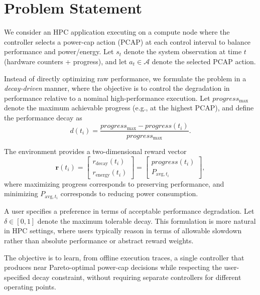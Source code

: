\section{Problem Statement}\label{sec:Problem}

We consider an HPC application executing on a compute node where the controller selects a power-cap action (PCAP) at each control interval to balance performance and power/energy. Let $s_t$ denote the system observation at time $t$ (hardware counters + progress), and let $a_t \in \mathcal{A}$ denote the selected PCAP action.

Instead of directly optimizing raw performance, we formulate the problem in a \textit{decay-driven} manner, where the objective is to control the degradation in performance relative to a nominal high-performance execution. Let $progress_{\max}$ denote the maximum achievable progress (e.g., at the highest PCAP), and define the performance decay as
\begin{equation}
\label{eq:decay}
d(t_i) = \frac{progress_{\max} - progress(t_i)}{progress_{\max}}.
\end{equation}

The environment provides a two-dimensional reward vector
\begin{equation}
\label{eq:reward_vector}
\mathbf{r}(t_i) =
\left[
\begin{array}{c}
r_{\text{decay}}(t_i) \\
r_{\text{energy}}(t_i)
\end{array}
\right]
=
\left[
\begin{array}{c}
progress(t_i) \\
P_{\text{avg},t_i}
\end{array}
\right],
\end{equation}
where maximizing progress corresponds to preserving performance, and minimizing $P_{\text{avg},t_i}$ corresponds to reducing power consumption.

A user specifies a preference in terms of acceptable performance degradation. Let $\delta \in [0,1]$ denote the maximum tolerable decay. This formulation is more natural in HPC settings, where users typically reason in terms of allowable slowdown rather than absolute performance or abstract reward weights.

The objective is to learn, from offline execution traces, a single controller that produces near Pareto-optimal power-cap decisions while respecting the user-specified decay constraint, without requiring separate controllers for different operating points.

